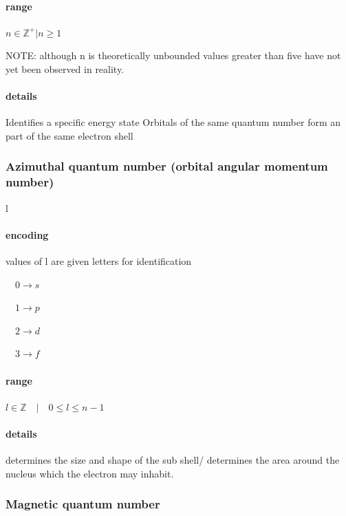 \documentclass[]{article}
\let\oldparagraph\paragraph
\renewcommand{\paragraph}[1]{\oldparagraph{#1}\mbox{}}
\begin{document}
\paragraph{range}\label{range}

\(n \in \mathbb{Z}^+| n \geq 1\)

NOTE: although n is theoretically unbounded values greater than five
have not yet been observed in reality.

\paragraph{details}\label{details}

Identifies a specific energy state Orbitals of the same quantum number
form an part of the same electron shell

\subsubsection{Azimuthal quantum number (orbital angular momentum
number)}\label{azimuthal-quantum-number-orbital-angular-momentum-number}

l

\paragraph{encoding}\label{encoding}

values of l are given letters for identification

\(\quad 0\rightarrow s\)

\(\quad 1\rightarrow p\)

\(\quad 2\rightarrow d\)

\(\quad 3\rightarrow f\)

\paragraph{range}\label{range-1}

\(l\in \mathbb{Z}\quad | \quad 0 \leq l \leq n-1\quad\)

\paragraph{details}\label{details-1}

determines the size and shape of the sub shell/ determines the area
around the nucleus which the electron may inhabit.

\subsubsection{Magnetic quantum number}\label{magnetic-quantum-number}
\end{document}
